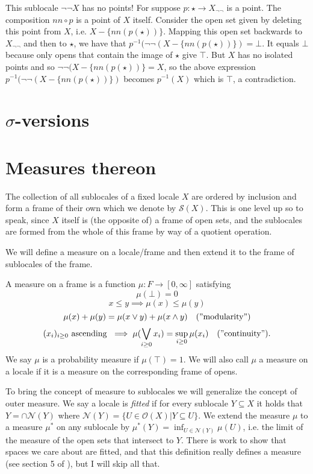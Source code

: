 \documentclass[14pt]{extarticle}
\renewcommand{\o}{\ensuremath{\mathcal{O}}}
\begin{document}
This sublocale $\neg\neg X$ has no points! For suppose $p:\star\to X_{\neg\neg}$ is a point. The composition $nn\circ p$ is a point of $X$ itself. Consider the open set given by deleting this point from $X$, i.e. $X-\{nn(p(\star))\}$. Mapping this open set backwards to $X_{\neg\neg}$ and then to $\star$, we have that $p^{-1}(\neg\neg(X-\{nn(p(\star))\}) = \bot$. It equals $\bot$ because only opens that contain the image of $\star$ give $\top$. But $X$ has no isolated points and so $\neg\neg(X-\{nn(p(\star))\} = X$, so the above expression $p^{-1}(\neg\neg(X-\{nn(p(\star))\})$ becomes $p^{-1}(X)$ which is $\top$, a contradiction.

\section{$\sigma$-versions}

\section{Measures thereon}
The collection of all sublocales of a fixed locale $X$ are ordered by inclusion and form a frame of their own which we denote by $\mathcal{S}(X)$. This is one level up so to speak, since $X$ itself is (the opposite of) a frame of open sets, and the sublocales are formed from the whole of this frame by way of a quotient operation.

We will define a measure on a locale/frame and then extend it to the frame of sublocales of the frame.

A measure on a frame is a function $\mu:F\to [0,\infty]$ satisfying
$$\mu(\bot)=0$$
$$x\leq y\implies \mu(x)\leq\mu(y)$$
$$\mu(x)+\mu(y)=\mu(x\vee y)+\mu(x\wedge y)\quad\mathrm{("modularity")}$$
$$(x_i)_{i\geq 0}\mathrm{\ ascending\ }\implies \mu(\bigvee_{i\geq 0}x_i)=\sup_{i\geq 0}\mu(x_i)\quad\mathrm{("continuity")}.$$
We say $\mu$ is a probability measure if $\mu(\top)=1$. We will also call $\mu$ a measure on a locale if it is a measure on the corresponding frame of opens.

To bring the concept of measure to sublocales we will generalize the concept of outer measure. We say a locale is \emph{fitted} if for every sublocale $Y\subseteq X$ it holds that $Y=\cap\mathcal{N}(Y)$ where $\mathcal{N}(Y)=\{U\in\o(X)|Y\subseteq U\}$. We extend the measure $\mu$ to a measure $\mu^*$ on any sublocale by $\mu^*(Y)=\inf_{U\in\mathcal{N}(Y)}\mu(U)$, i.e. the limit of the measure of the open sets that intersect to $Y$. There is work to show that spaces we care about are fitted, and that this definition really defines a measure (see section 5 of \cite{simpson}), but I will skip all that.
\end{document}
